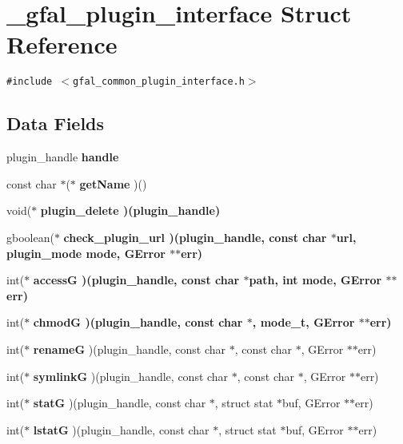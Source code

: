 \section{\_\-gfal\_\-plugin\_\-interface Struct Reference}
\label{struct__gfal__plugin__interface}
{\tt \#include $<$gfal\_\-common\_\-plugin\_\-interface.h$>$}

\subsection*{Data Fields}
\begin{CompactItemize}
\item 
plugin\_\-handle \textbf{handle}\label{struct__gfal__plugin__interface_510b7d8a34cd71f63211ee614ae265db}

\item 
const char $\ast$($\ast$ \textbf{get\-Name} )()\label{struct__gfal__plugin__interface_f665fe60fb0e0a7d58234b21390d8b01}

\item 
void($\ast$ \bf{plugin\_\-delete} )(plugin\_\-handle)
\item 
gboolean($\ast$ \bf{check\_\-plugin\_\-url} )(plugin\_\-handle, const char $\ast$url, plugin\_\-mode mode, GError $\ast$$\ast$err)
\item 
int($\ast$ \bf{access\-G} )(plugin\_\-handle, const char $\ast$path, int mode, GError $\ast$$\ast$err)
\item 
int($\ast$ \bf{chmod\-G} )(plugin\_\-handle, const char $\ast$, mode\_\-t, GError $\ast$$\ast$err)
\item 
int($\ast$ \textbf{rename\-G} )(plugin\_\-handle, const char $\ast$, const char $\ast$, GError $\ast$$\ast$err)\label{struct__gfal__plugin__interface_49e135ba301e599ddd6d9a634de347ac}

\item 
int($\ast$ \textbf{symlink\-G} )(plugin\_\-handle, const char $\ast$, const char $\ast$, GError $\ast$$\ast$err)\label{struct__gfal__plugin__interface_9fdf6235eccb1eb2312dc7b73b451e66}

\item 
int($\ast$ \textbf{stat\-G} )(plugin\_\-handle, const char $\ast$, struct stat $\ast$buf, GError $\ast$$\ast$err)\label{struct__gfal__plugin__interface_8db37c3af860f063277a40798821cfc2}

\item 
int($\ast$ \textbf{lstat\-G} )(plugin\_\-handle, const char $\ast$, struct stat $\ast$buf, GError $\ast$$\ast$err)\label{struct__gfal__plugin__interface_5654611b3cce424dfa4bf03a5af7bed5}


\end{CompactItemize}
